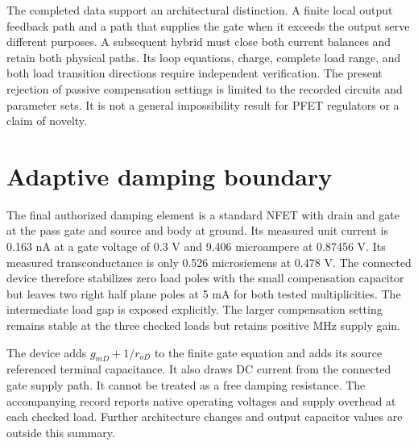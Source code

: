 The completed data support an architectural distinction. A finite local output feedback path and a path that supplies the gate when it exceeds the output serve different purposes. A subsequent hybrid must close both current balances and retain both physical paths. Its loop equations, charge, complete load range, and both load transition directions require independent verification. The present rejection of passive compensation settings is limited to the recorded circuits and parameter sets. It is not a general impossibility result for PFET regulators or a claim of novelty.

\section{Adaptive damping boundary}
The final authorized damping element is a standard NFET with drain and gate at the pass gate and source and body at ground. Its measured unit current is 0.163 nA at a gate voltage of 0.3 V and 9.406 microampere at 0.87456 V. Its measured transconductance is only 0.526 microsiemens at 0.478 V. The connected device therefore stabilizes zero load poles with the small compensation capacitor but leaves two right half plane poles at 5 mA for both tested multiplicities. The intermediate load gap is exposed explicitly. The larger compensation setting remains stable at the three checked loads but retains positive MHz supply gain.

The device adds $g_{mD}+1/r_{oD}$ to the finite gate equation and adds its source referenced terminal capacitance. It also draws DC current from the connected gate supply path. It cannot be treated as a free damping resistance. The accompanying record reports native operating voltages and supply overhead at each checked load. Further architecture changes and output capacitor values are outside this summary.
